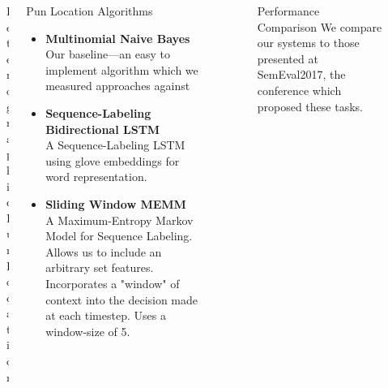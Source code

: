 \documentclass[final]{beamer}
\newlength{\sepwid}
\newlength{\onecolwid}
\newlength{\twocolwid}
\begin{document}
\begin{frame}[t]
\begin{columns}[t]
\begin{column}{\twocolwid}
\begin{columns}[t,totalwidth=\twocolwid]
\begin{column}{\onecolwid}
\begin{figure}
					\caption{\hspace{50mm}Heterographic Pun Location}
					\end{figure}
				\end{column}
				\begin{column}{\onecolwid}
					\vspace{55mm}
					\begin{block}{Pun Location Algorithms}
						{\large 
							\begin{itemize}
								\item {\textbf{Multinomial Naive Bayes}\\
									Our baseline---an easy to implement algorithm which we measured approaches against
								}
								\item {\textbf{Sequence-Labeling Bidirectional LSTM}\\
									A Sequence-Labeling LSTM using glove embeddings for word representation.
								}
								\item {\textbf{Sliding Window MEMM}\\
									A Maximum-Entropy Markov Model for Sequence Labeling. Allows us to include an arbitrary set features. Incorporates a "window" of context into the decision made at each timestep. Uses a window-size of 5. 
								}
							\end{itemize}
							\\
						}
					\end{block}
				\end{column}
				\begin{column}{\sepwid}\end{column}
			\end{columns}
		\end{column}
		\begin{column}{\sepwid}\end{column}
		\begin{column}{\onecolwid}
            \begin{block}{Performance Comparison}
				\large{
					We compare our systems to those presented at SemEval2017, the conference which proposed these tasks.
				}
				\vspace{10mm}

\end{block}
\end{column}
\end{columns}
\end{frame}
\end{document}
